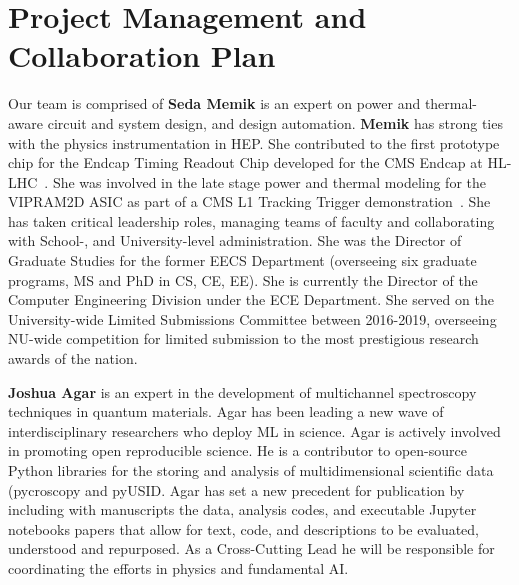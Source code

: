 \section{Project Management and Collaboration Plan}\label{sec.mangtplan}
Our team is comprised of 
{\bf Seda Memik} is an expert on power and thermal-aware circuit and system design, and design automation. \textbf{Memik} has strong ties with the physics instrumentation in HEP. She contributed to the first prototype chip for the Endcap Timing Readout Chip developed for the CMS Endcap at HL-LHC~\cite{Liu:2019twepp}. She was involved in the late stage power and thermal modeling for the VIPRAM2D ASIC as part of a CMS L1 Tracking Trigger demonstration~\cite{Deptuch:2289503}. She has taken critical leadership roles, managing teams of faculty and collaborating with School-, and University-level administration. 
She was the Director of Graduate Studies for the former EECS Department (overseeing six graduate programs, MS and PhD in CS, CE, EE). 
She is currently the Director of the Computer Engineering Division under the ECE Department. 
She served on the University-wide Limited Submissions Committee between 2016-2019, overseeing NU-wide competition for limited submission to the most prestigious research awards of the nation. 


\textbf{Joshua Agar}
is an expert in the development of multichannel spectroscopy techniques in quantum materials.\cite{Pandya2019-ma,Ievlev2018-sw,Saremi2018-py,Agar2018-ew,Ievlev2018-uq, Ievlev2018-us,Damodaran2017-mv,Damodaran2017-ve,Agar2016-fx,Pandya2016-hy,Damodaran2016-dk,Agar2016-ys,Zhang2015-oz,Agar2015-sv,Agar2014-ds,Mangalam2013-ne,Mangalam2013-tw,Karthik2013-zm,Karthik2012-ad}
Agar has been leading a new wave of interdisciplinary researchers who deploy ML in science. 
Agar is actively involved in promoting open reproducible science. He is a contributor to open-source Python libraries for the storing and analysis of multidimensional scientific data (pycroscopy\cite{Somnath2018-yp} and pyUSID\cite{Somnath2018-yp}. Agar has set a new precedent for publication by including with manuscripts the data, analysis codes, and executable Jupyter notebooks papers that allow for text, code, and descriptions to be evaluated, understood and repurposed. 
As a Cross-Cutting Lead he will be responsible for coordinating the efforts in physics and fundamental AI. 



